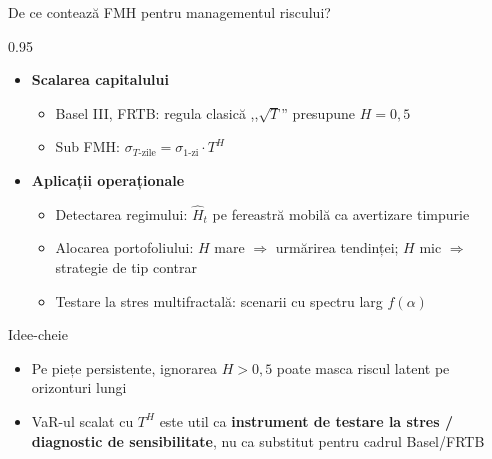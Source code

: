 \documentclass[9pt, aspectratio=169, t]{beamer}
\begin{document}
\begin{frame}[shrink=15]{De ce contează FMH pentru managementul riscului?}
\begin{cminipage}{0.95\textwidth}
\begin{itemize}\setlength{\itemsep}{2pt}
    \item \textbf{Scalarea capitalului}
    \begin{itemize}\setlength{\itemsep}{0pt}
        \item Basel III, FRTB: regula clasică ,,$\sqrt T$'' presupune $H=0{,}5$
        \item Sub FMH: $\sigma_{T\text{-zile}}=\sigma_{1\text{-zi}}\cdot T^H$
    \end{itemize}
    \item \textbf{Aplicații operaționale}
    \begin{itemize}\setlength{\itemsep}{0pt}
        \item Detectarea regimului: $\hat H_t$ pe fereastră mobilă ca avertizare timpurie
        \item Alocarea portofoliului: $H$ mare $\Rightarrow$ urmărirea tendinței; $H$ mic $\Rightarrow$ strategie de tip contrar
        \item Testare la stres multifractală: scenarii cu spectru larg $f(\alpha)$
    \end{itemize}
\end{itemize}
\begin{exampleblock}{Idee-cheie}
\begin{itemize}\setlength{\itemsep}{0pt}
    \item Pe piețe persistente, ignorarea $H>0{,}5$ poate masca riscul latent pe orizonturi lungi
    \item VaR-ul scalat cu $T^H$ este util ca \textbf{instrument de testare la stres / diagnostic de sensibilitate}, nu ca substitut pentru cadrul Basel/FRTB
\end{itemize}
\end{exampleblock}
\end{cminipage}
\end{frame}
\end{document}
